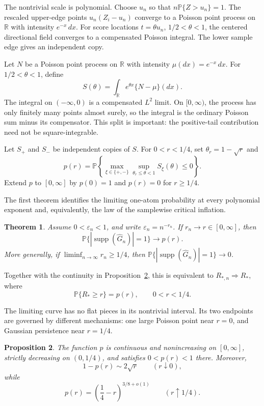 \documentclass[11pt]{article}
\newtheorem{theorem}{Theorem}[section]
\newtheorem{proposition}[theorem]{Proposition}
\theoremstyle{definition}
\numberwithin{equation}{section}
\newcommand{\Pbb}{\mathbb{P}}
\newcommand{\R}{\mathbb{R}}
\newcommand{\wh}{\widehat}
\newcommand{\eps}{\varepsilon}
\DeclareMathOperator{\supp}{supp}
\begin{document}
The nontrivial scale is polynomial. Choose \(u_n\) so that
\(n\Pbb\{Z>u_n\}=1\). The rescaled upper-edge points
\(u_n(Z_i-u_n)\) converge to a Poisson point process on \(\R\) with intensity
\(e^{-x}\,dx\). For score locations \(t=\theta u_n\),
\(1/2<\theta<1\), the centered directional field converges to a compensated
Poisson integral. The lower sample edge gives an independent copy.

Let \(N\) be a Poisson point process on \(\R\) with intensity
\(\mu(dx)=e^{-x}\,dx\). For \(1/2<\theta<1\), define
\begin{equation}
\label{eq:S-intro}
    S(\theta)=\int_\R e^{\theta x}\{N-\mu\}(dx).
\end{equation}
The integral on \((-\infty,0)\) is a compensated \(L^2\) limit. On
\([0,\infty)\), the process has only finitely many points almost surely, so
the integral is the ordinary Poisson sum minus its compensator. This split is
important: the positive-tail contribution need not be square-integrable.

Let \(S_+\) and \(S_-\) be independent copies of \(S\). For
\(0<r<1/4\), set \(\theta_r=1-\sqrt r\) and
\begin{equation}
\label{eq:p-intro}
    p(r)=
    \Pbb\left\{
       \max_{\xi\in\{+,-\}}
       \sup_{\theta_r\le\theta<1}S_\xi(\theta)\le0
    \right\}.
\end{equation}
Extend \(p\) to \([0,\infty]\) by \(p(0)=1\) and
\(p(r)=0\) for \(r\ge1/4\).

The first theorem identifies the limiting one-atom probability at every
polynomial exponent and, equivalently, the law of the samplewise critical
inflation.
\begin{theorem}
\label{thm:exponent-phase-diagram}
Assume \(0<\eps_n<1\), and write \(\eps_n=n^{-r_n}\). If
\(r_n\to r\in[0,\infty]\), then
\[
    \Pbb\{|\supp(\wh G_n)|=1\}\longrightarrow p(r).
\]
More generally, if \(\liminf_{n\to\infty}r_n\ge1/4\), then
\(\Pbb\{|\supp(\wh G_n)|=1\}\to0\).
\end{theorem}

Together with the continuity in Proposition~\ref{prop:phase-curve-properties},
this is equivalent to \(R_{*,n}\Rightarrow R_*\), where
\[
    \Pbb\{R_*\ge r\}=p(r),
    \qquad 0<r<1/4.
\]

The limiting curve has no flat pieces in its nontrivial interval. Its two
endpoints are governed by different mechanisms: one large Poisson point near
\(r=0\), and Gaussian persistence near \(r=1/4\).
\begin{proposition}
\label{prop:phase-curve-properties}
The function \(p\) is continuous and nonincreasing on \([0,\infty]\), strictly
decreasing on \((0,1/4)\), and satisfies \(0<p(r)<1\) there. Moreover,
\[
    1-p(r)\sim2\sqrt r
    \qquad(r\downarrow0),
\]
while
\[
    p(r)=\left(\frac14-r\right)^{3/8+o(1)}
    \qquad(r\uparrow1/4).
\]
\end{proposition}
\end{document}
